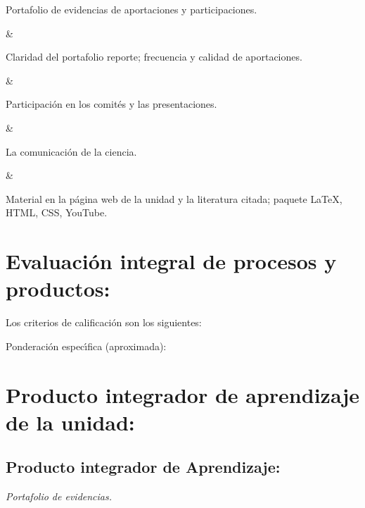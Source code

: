 \quad



Portafolio de evidencias de aportaciones y participaciones.

&

Claridad del portafolio reporte; frecuencia y calidad de aportaciones.

&

Participaci\'{o}n en los comit\'{e}s y las presentaciones.

&

La comunicaci\'{o}n de la ciencia.

&

Material en la p\'{a}gina web de la unidad y la literatura citada;
paquete {\LaTeX}, HTML, CSS, YouTube.



\section{Evaluaci\'{o}n integral de procesos y productos:}

Los criterios de calificaci\'{o}n son los siguientes:

  
Ponderaci\'{o}n espec\'{\i}fica (aproximada):



\section{Producto integrador de aprendizaje de la unidad:}

\subsection{Producto integrador de Aprendizaje:}

\quad

{\em Portafolio de evidencias.}



